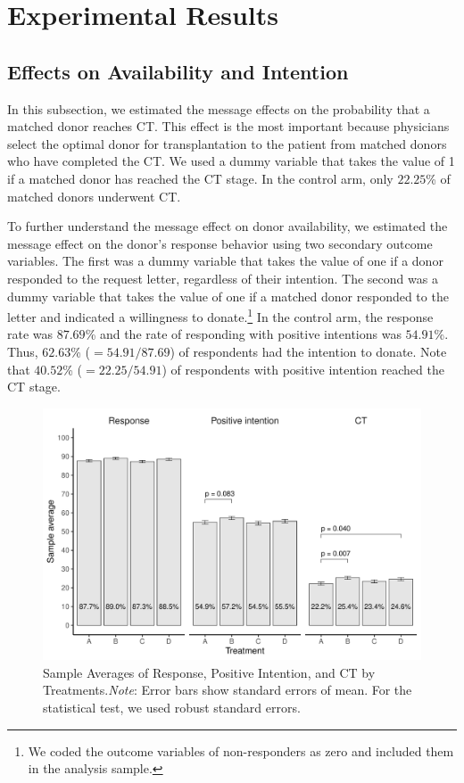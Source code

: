 \documentclass[12pt, a4paper]{article}
\begin{document}
\hypertarget{result}{%
\section{Experimental Results}\label{result}}

\hypertarget{main}{%
\subsection{Effects on Availability and Intention}\label{main}}

In this subsection, we estimated the message effects on the probability that a matched donor reaches CT. This effect is the most important because physicians select the optimal donor for transplantation to the patient from matched donors who have completed the CT. We used a dummy variable that takes the value of 1 if a matched donor has reached the CT stage. In the control arm, only \(22.25\)\% of matched donors underwent CT.

To further understand the message effect on donor availability, we estimated the message effect on the donor's response behavior using two secondary outcome variables. The first was a dummy variable that takes the value of one if a donor responded to the request letter, regardless of their intention. The second was a dummy variable that takes the value of one if a matched donor responded to the letter and indicated a willingness to donate.\footnote{We coded the outcome variables of non-responders as zero and included them in the analysis sample.} In the control arm, the response rate was \(87.69\)\% and the rate of responding with positive intentions was \(54.91\)\%. Thus, \(62.63\)\% (\(=54.91/87.69\)) of respondents had the intention to donate. Note that \(40.52\)\% (\(=22.25/54.91\)) of respondents with positive intention reached the CT stage.

\begin{figure}[t]
\includegraphics{JMDP RCT - Main Document_files/figure-latex/stock-diff-mean-1} \caption{Sample Averages of Response, Positive Intention, and CT by Treatments.\newline \emph{Note}: Error bars show standard errors of mean. For the statistical test, we used robust standard errors.}\label{fig:stock-diff-mean}
\end{figure}
\end{document}
